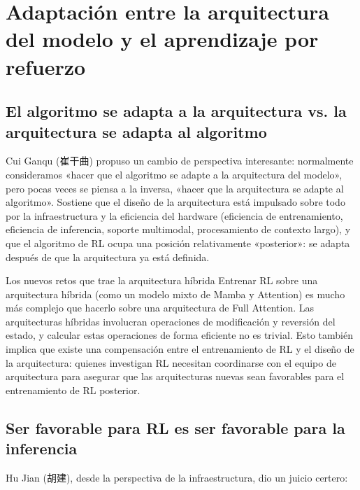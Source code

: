 \section{Adaptación entre la arquitectura del modelo y el aprendizaje por refuerzo}

\subsection{El algoritmo se adapta a la arquitectura vs. la arquitectura se adapta al algoritmo}

Cui Ganqu (崔干曲) propuso un cambio de perspectiva interesante: normalmente consideramos «hacer que el algoritmo se adapte a la arquitectura del modelo», pero pocas veces se piensa a la inversa, «hacer que la arquitectura se adapte al algoritmo». Sostiene que el diseño de la arquitectura está impulsado sobre todo por la infraestructura y la eficiencia del hardware (eficiencia de entrenamiento, eficiencia de inferencia, soporte multimodal, procesamiento de contexto largo), y que el algoritmo de RL ocupa una posición relativamente «posterior»: se adapta después de que la arquitectura ya está definida.

\begin{warningbox}{Los nuevos retos que trae la arquitectura híbrida}
Entrenar RL sobre una arquitectura híbrida (como un modelo mixto de Mamba y Attention) es mucho más complejo que hacerlo sobre una arquitectura de Full Attention. Las arquitecturas híbridas involucran operaciones de modificación y reversión del estado, y calcular estas operaciones de forma eficiente no es trivial. Esto también implica que existe una compensación entre el entrenamiento de RL y el diseño de la arquitectura: quienes investigan RL necesitan coordinarse con el equipo de arquitectura para asegurar que las arquitecturas nuevas sean favorables para el entrenamiento de RL posterior.
\end{warningbox}

\subsection{Ser favorable para RL es ser favorable para la inferencia}

Hu Jian (胡建), desde la perspectiva de la infraestructura, dio un juicio certero:

